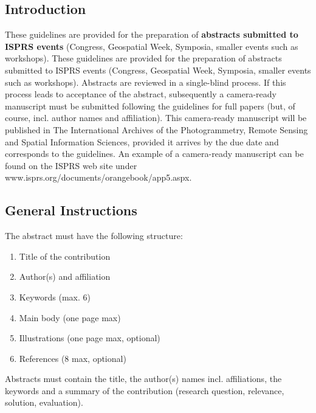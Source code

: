 \documentclass{isprs} %
\begin{document}
\sloppy

\subsection{Introduction}
\label{sec:Introduction}
These guidelines are provided for the preparation of \textbf{abstracts submitted to ISPRS events} (Congress, Geospatial Week, Symposia, smaller events such as workshops). These guidelines are provided for the preparation of abstracts submitted to ISPRS events (Congress, Geospatial Week, Symposia, smaller events such as workshops). Abstracts are reviewed in a single-blind process. If this process leads to acceptance of the abstract, subsequently a camera-ready manuscript must be submitted following the guidelines for full papers (but, of course, incl. author names and affiliation). This camera-ready manuscript will be published in The International Archives of the Photogrammetry, Remote Sensing and Spatial Information Sciences, provided it arrives by the due date and corresponds to the guidelines. 
An example of a camera-ready manuscript can be found on the ISPRS web site under www.isprs.org/documents/orangebook/app5.aspx.

\subsection{General Instructions}\label{sec:General Instructions}

The abstract must have the following structure: 

\begin{enumerate}
\setlength\itemsep{0em}\setlength\parskip{0em}\setlength\topsep{0em}\setlength\partopsep{0em}\setlength\parsep{0em} 
\item{Title of the contribution} 
\item{Author(s) and affiliation}
\item{Keywords (max. 6)}
\item{Main body (one page max)}
\item{Illustrations (one page max, optional)}
\item{References (8 max, optional)}
\end{enumerate}

Abstracts must contain the title, the author(s) names incl. affiliations, the keywords and a summary of the contribution (research question, relevance, solution, evaluation).
          
\end{document}

